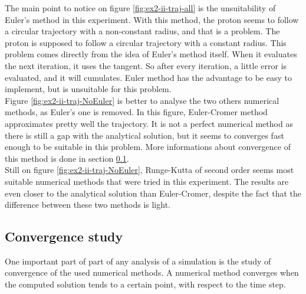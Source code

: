 \documentclass[a4paper,12pt,twoside]{article}
\begin{document}
The main point to notice on figure \ref{fig:ex2-ii-traj-all} is the unsuitability of Euler's method in this experiment.
With this method, the proton seems to follow a circular trajectory with a non-constant radius, and that is a problem.
The proton is supposed to follow a circular trajectory with a constant radius.
This problem comes directly from the idea of Euler's method itself.
When it evaluates the next iteration, it uses  the tangent. %
So after every iteration, a little error is evaluated, and it will cumulates.
Euler method has the advantage to be easy to implement, but is unsuitable for this problem.\\

Figure \ref{fig:ex2-ii-traj-NoEuler} is better to analyse the two others numerical methods, as Euler's one is removed.
In this figure, Euler-Cromer method approximates pretty well the trajectory.
It is not a perfect numerical method as there is still a gap with the analytical solution, but it seems to converges fast enough to be suitable in this problem.
More informations about convergence of this method is done in section \ref{sec:etude-conv}. \\

Still on figure \ref{fig:ex2-ii-traj-NoEuler}, Runge-Kutta of second order seems most suitable numerical methods that were tried in this experiment.
The results are even closer to the analytical solution than Euler-Cromer, despite the fact that the difference between these two methods is light.


\subsection{Convergence study}\label{sec:etude-conv}
One important part of part of any analysis of a simulation is the study of convergence of the used numerical methods.
A numerical method converges when the computed solution tends to a certain point, with respect to the time step.
\end{document}
